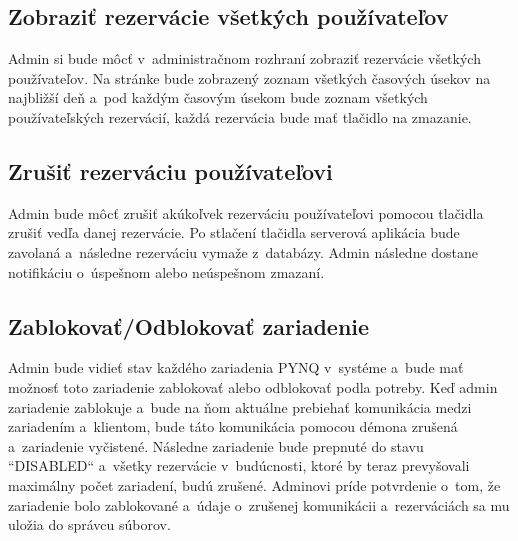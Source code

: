 \subsection{Zobraziť rezervácie všetkých používateľov}

Admin si bude môcť v~administračnom rozhraní zobraziť rezervácie všetkých používateľov. Na stránke bude zobrazený zoznam všetkých časových úsekov na najbližší deň a~pod každým časovým úsekom bude zoznam všetkých používateľských rezervácií, každá rezervácia bude mať tlačidlo na zmazanie.

\subsection{Zrušiť rezerváciu používateľovi}

Admin bude môcť zrušiť akúkoľvek rezerváciu používateľovi pomocou tlačidla zrušiť vedľa danej rezervácie. Po stlačení tlačidla serverová aplikácia bude zavolaná a~následne rezerváciu vymaže z~databázy. Admin následne dostane notifikáciu o~úspešnom alebo neúspešnom zmazaní.

\subsection{Zablokovať/Odblokovať zariadenie}

Admin bude vidieť stav každého zariadenia PYNQ v~systéme a~bude mať možnosť toto zariadenie zablokovať alebo odblokovať podla potreby. Keď admin zariadenie zablokuje a~bude na ňom aktuálne prebiehať komunikácia medzi zariadením a~klientom, bude táto komunikácia pomocou démona zrušená a~zariadenie vyčistené. Následne zariadenie bude prepnuté do stavu ``DISABLED`` a~všetky rezervácie v~budúcnosti, ktoré by teraz prevyšovali maximálny počet zariadení, budú zrušené. Adminovi príde potvrdenie o~tom, že zariadenie bolo zablokované a~údaje o~zrušenej komunikácii a~rezerváciách sa mu uložia do správcu súborov. 

